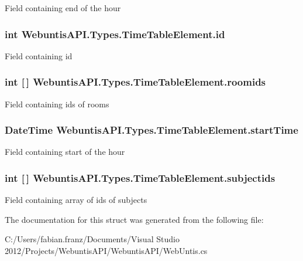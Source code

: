 Field containing end of the hour \hypertarget{struct_webuntis_a_p_i_1_1_types_1_1_time_table_element_a3d6f4d06843dbad8ddbdbd21e2aea0b6}{
\subsubsection[{id}]{\setlength{\rightskip}{0pt plus 5cm}int Webuntis\-A\-P\-I.\-Types.\-Time\-Table\-Element.\-id}}\label{struct_webuntis_a_p_i_1_1_types_1_1_time_table_element_a3d6f4d06843dbad8ddbdbd21e2aea0b6}
Field containing id \hypertarget{struct_webuntis_a_p_i_1_1_types_1_1_time_table_element_add1b2a25e2b6c0c7cb02ef57c6b2ea6b}{
\subsubsection[{roomids}]{\setlength{\rightskip}{0pt plus 5cm}int \mbox{[}$\,$\mbox{]} Webuntis\-A\-P\-I.\-Types.\-Time\-Table\-Element.\-roomids}}\label{struct_webuntis_a_p_i_1_1_types_1_1_time_table_element_add1b2a25e2b6c0c7cb02ef57c6b2ea6b}
Field containing ids of rooms \hypertarget{struct_webuntis_a_p_i_1_1_types_1_1_time_table_element_a9a7059aea921d721fea81b09882c8b2f}{
\subsubsection[{start\-Time}]{\setlength{\rightskip}{0pt plus 5cm}Date\-Time Webuntis\-A\-P\-I.\-Types.\-Time\-Table\-Element.\-start\-Time}}\label{struct_webuntis_a_p_i_1_1_types_1_1_time_table_element_a9a7059aea921d721fea81b09882c8b2f}
Field containing start of the hour \hypertarget{struct_webuntis_a_p_i_1_1_types_1_1_time_table_element_a3603be7f40d3358ce0f1a9a0b583cae6}{
\subsubsection[{subjectids}]{\setlength{\rightskip}{0pt plus 5cm}int \mbox{[}$\,$\mbox{]} Webuntis\-A\-P\-I.\-Types.\-Time\-Table\-Element.\-subjectids}}\label{struct_webuntis_a_p_i_1_1_types_1_1_time_table_element_a3603be7f40d3358ce0f1a9a0b583cae6}
Field containing array of ids of subjects 

The documentation for this struct was generated from the following file\-:\begin{DoxyCompactItemize}
\item 
C\-:/\-Users/fabian.\-franz/\-Documents/\-Visual Studio 2012/\-Projects/\-Webuntis\-A\-P\-I/\-Webuntis\-A\-P\-I/Web\-Untis.\-cs\end{DoxyCompactItemize}
